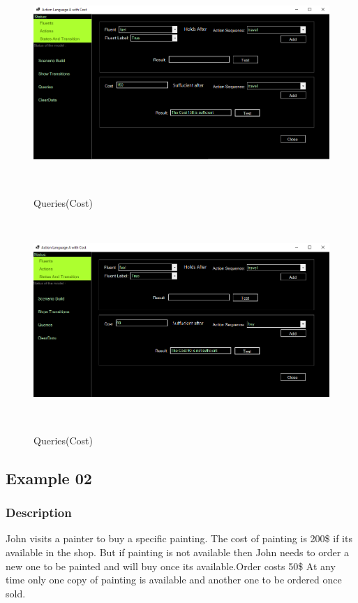 \documentclass[11pt]{article}
\begin{document}
	\begin{figure}[H]
		\centering
		\includegraphics[width=6in,height=3in]{./testImages/Example1/img9.png}
		\label{Figure:f01.8}
		\caption{Queries(Cost)}
	\end{figure}
	\begin{figure}[H]
		\centering
		\includegraphics[width=6in,height=3in]{./testImages/Example1/img10.png}
		\label{Figure:f01.8}
		\caption{Queries(Cost)}
	\end{figure}

		
	\subsection{Example 02}\label{example:ex02}
	\subsubsection{Description}\label{par:p102}
	John visits a painter to buy a specific painting. The cost of painting is 200\$ if its available in the shop. But if painting is not available then John needs to order a new one to be painted and will buy once its available.Order costs 50\$ At any time only one copy of painting is available and another one to be ordered once sold. 
	
\end{document}
